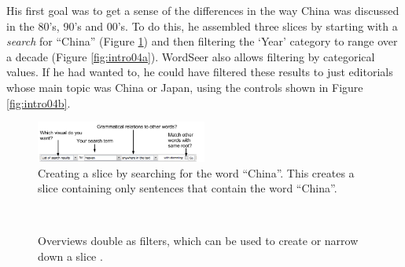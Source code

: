 \documentclass{sig-alternate}
\begin{document}
His first goal was to get a sense of the differences in the way China was discussed in the 80's, 90's and 00's. To do this, he assembled three slices by starting with a \emph{search} for ``China'' (Figure \ref{fig:intro03})  and then filtering the `Year' category to range over a decade (Figure \ref{fig:intro04a}).  WordSeer also allows filtering by categorical values. If he had wanted to, he could have filtered these results to just editorials whose main topic was China or Japan, using the controls shown in Figure \ref{fig:intro04b}. 
\begin{figure}[ht!]
\begin{center}
	\includegraphics[width=0.5\textwidth]{fig/intro/03b.png}
\end{center}
    \caption{%
        Creating a slice by searching for the word ``China''. This creates a slice containing only sentences that contain the word ``China''. \label{fig:intro03}
     }%
\end{figure}

\begin{figure}[ht!]
\begin{center}
%
        \\
%
    \end{center}
    \caption{%
     Overviews double as filters, which can be used to create or narrow down a slice \label{fig:intro04}.
     }%
\end{figure}
\end{document}
